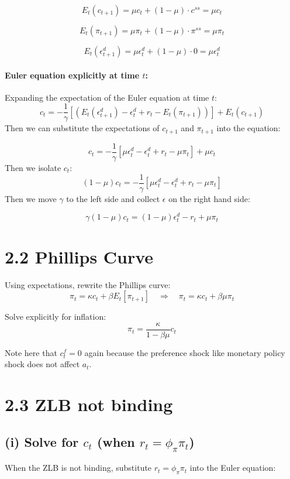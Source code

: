 \documentclass{article}
\begin{document}
\[
E_t(c_{t+1}) = \mu c_t + (1 - \mu)\cdot c^{ss} = \mu c_t
\]

\[
E_t(\pi_{t+1}) = \mu \pi_t + (1 - \mu)\cdot \pi^{ss} = \mu \pi_t
\]

\[
E_t(\epsilon_{t+1}^d) = \mu \epsilon_t^d + (1 - \mu)\cdot 0 = \mu \epsilon_t^d
\]

\paragraph{Euler equation explicitly at time \(t\):} Expanding the expectation of the Euler equation at time \(t\):
\[
c_t = -\frac{1}{\gamma}\left[(E_t(\epsilon_{t+1}^d) - \epsilon_t^d + r_t - E_t(\pi_{t+1}))\right] + E_t(c_{t+1})
\]
Then we can substitute the expectations of \(c_{t+1}\) and \(\pi_{t+1}\) into the equation:

\[
c_t = -\frac{1}{\gamma}\left[\mu \epsilon_t^d - \epsilon_t^d + r_t - \mu \pi_t\right] + \mu c_t
\]
Then we isolate $c_t$:
\[
(1-\mu)c_t=-\frac{1}{\gamma}\left[\mu \epsilon_t^d - \epsilon_t^d + r_t - \mu \pi_t\right]
\]
Then we move $\gamma$ to the left side and collect $\epsilon$ on the right hand side:

\[
\gamma(1 - \mu)c_t = (1 - \mu)\epsilon_t^d - r_t + \mu \pi_t
\]

\section*{2.2 Phillips Curve}

Using expectations, rewrite the Phillips curve:
\[
\pi_t = \kappa c_t + \beta E_t[\pi_{t+1}] \quad \Rightarrow \quad \pi_t = \kappa c_t + \beta \mu \pi_t
\]

Solve explicitly for inflation:
\[
\pi_t = \frac{\kappa}{1 - \beta \mu} c_t
\]

Note here that $c_t^f=0$ again because the preference shock like monetary policy shock does not affect $a_t$.

\section*{2.3 ZLB not binding}

\subsection*{(i) Solve for \(c_t\) (when \(r_t = \phi_{\pi}\pi_t\))}

When the ZLB is not binding, substitute \(r_t = \phi_{\pi}\pi_t\) into the Euler equation:
\end{document}
